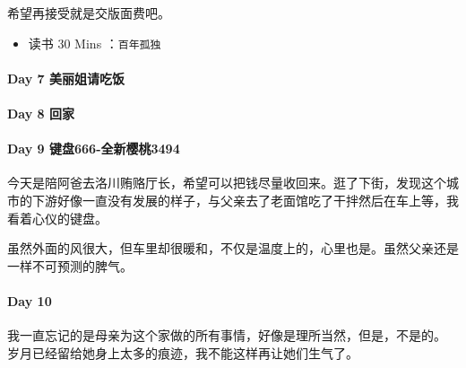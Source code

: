 \documentclass[UTF8,a4paper,8pt]{ctexart}
\begin{document}
		希望再接受就是交版面费吧。
		\begin{itemize}[itemindent = 1em]
			\renewcommand\labelitemi{\makebox[0pt][l]{$\square$}\raisebox{.15ex}{\hspace{0.1em}$\checkmark$}}		
			
			\renewcommand\labelitemi{\makebox[0pt][l]{$\square$}\hspace{1em}}
			\item   读书  30 Mins	：\verb|百年孤独|

		\end{itemize}
		
	\paragraph{Day 7  美丽姐请吃饭     \quad     }
	\paragraph{Day 8  回家     \quad     }
	\paragraph{Day 9  键盘666-全新樱桃3494     \quad     }
		今天是陪阿爸去洛川贿赂厅长，希望可以把钱尽量收回来。逛了下街，发现这个城市的下游好像一直没有发展的样子，与父亲去了老面馆吃了干拌然后在车上等，我看着心仪的键盘。
		
		虽然外面的风很大，但车里却很暖和，不仅是温度上的，心里也是。虽然父亲还是一样不可预测的脾气。
		
	\paragraph{Day 10      \quad     }
		我一直忘记的是母亲为这个家做的所有事情，好像是理所当然，但是，不是的。 岁月已经留给她身上太多的痕迹，我不能这样再让她们生气了。
		
\end{document}
